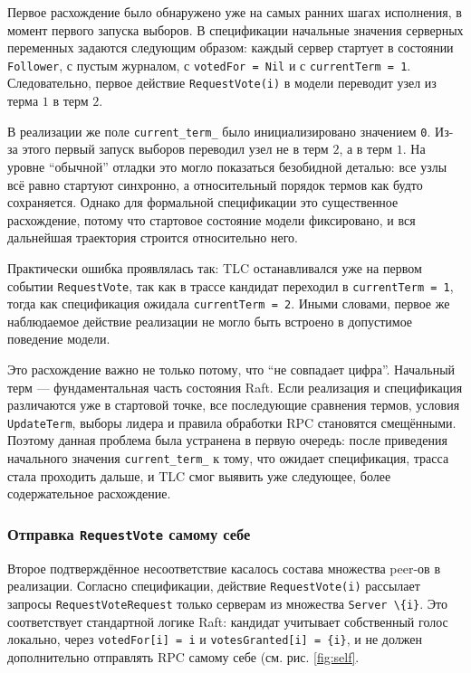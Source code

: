 Первое расхождение было обнаружено уже на самых ранних шагах исполнения, в
момент первого запуска выборов. В спецификации начальные значения серверных
переменных задаются следующим образом: каждый сервер стартует в состоянии
\texttt{Follower}, с пустым журналом, с \texttt{votedFor = Nil} и с
\texttt{currentTerm = 1}. Следовательно, первое действие
\texttt{RequestVote(i)} в модели переводит узел из терма $1$ в терм $2$.

В реализации же поле \texttt{current\_term\_} было инициализировано значением
\texttt{0}. Из-за этого первый запуск выборов переводил узел не в терм $2$, а
в терм $1$. На уровне ``обычной'' отладки это могло показаться безобидной
деталью: все узлы всё равно стартуют синхронно, а относительный порядок термов
как будто сохраняется. Однако для формальной спецификации это существенное
расхождение, потому что стартовое состояние модели фиксировано, и вся дальнейшая
траектория строится относительно него.

Практически ошибка проявлялась так: TLC останавливался уже на первом событии
\texttt{RequestVote}, так как в трассе кандидат переходил в
\texttt{currentTerm = 1}, тогда как спецификация ожидала
\texttt{currentTerm = 2}. Иными словами, первое же наблюдаемое действие
реализации не могло быть встроено в допустимое поведение модели.

Это расхождение важно не только потому, что ``не совпадает цифра''.
Начальный терм --- фундаментальная часть состояния Raft. Если реализация и
спецификация различаются уже в стартовой точке, все последующие сравнения
термов, условия \texttt{UpdateTerm}, выборы лидера и правила обработки RPC
становятся смещёнными. Поэтому данная проблема была устранена в первую очередь:
после приведения начального значения \texttt{current\_term\_} к тому, что
ожидает спецификация, трасса стала проходить дальше, и TLC смог выявить уже
следующее, более содержательное расхождение.

\subsubsection*{Отправка \texttt{RequestVote} самому себе}

Второе подтверждённое несоответствие касалось состава множества peer-ов в
реализации. Согласно спецификации, действие \texttt{RequestVote(i)}
рассылает запросы \texttt{RequestVoteRequest} только серверам из множества
\texttt{Server \textbackslash \{i\}}. Это соответствует стандартной логике
Raft: кандидат учитывает собственный голос локально, через
\texttt{votedFor[i] = i} и \texttt{votesGranted[i] = \{i\}}, и не должен
дополнительно отправлять RPC самому себе (см. рис. \ref{fig:self}.

